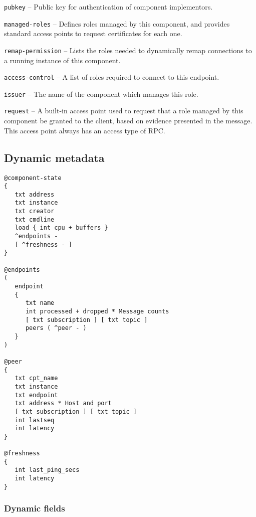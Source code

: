 \documentclass[12pt,a4paper,twoside]{article}
\renewcommand{\_}{\texttt{\symbol{95}}}
\begin{document}
\begin{bulletlist}
\item \verb^pubkey^ -- Public key for authentication of component implementors.
\item \verb^managed-roles^ -- Defines roles managed by this component,
		and provides standard access points to request certificates for each one.
\item \verb^remap-permission^ -- Lists the roles needed to dynamically remap
		connections to a running instance of this component.
\item \verb^access-control^ -- A list of roles required to connect to this
		endpoint.
\item \verb^issuer^ -- The name of the component which manages this role.
\item \verb^request^ -- A built-in access point used to request
		that a role managed by this component be granted to the client,
		based on evidence presented in the message. This access point always
		has an access type of RPC.
\end{bulletlist}

\newpage
\subsection{Dynamic metadata}
\label{status}

\begin{verbatim}
@component-state
{
   txt address
   txt instance
   txt creator
   txt cmdline
   load { int cpu + buffers }
   ^endpoints -
   [ ^freshness - ]
}

@endpoints
(
   endpoint
   {
      txt name
      int processed + dropped * Message counts
      [ txt subscription ] [ txt topic ]
      peers ( ^peer - )
   }
)

@peer
{
   txt cpt_name
   txt instance
   txt endpoint
   txt address * Host and port
   [ txt subscription ] [ txt topic ]
   int lastseq
   int latency
}

@freshness
{
   int last_ping_secs
   int latency
}
\end{verbatim}

\newpage
\subsubsection{Dynamic fields}
\end{document}
